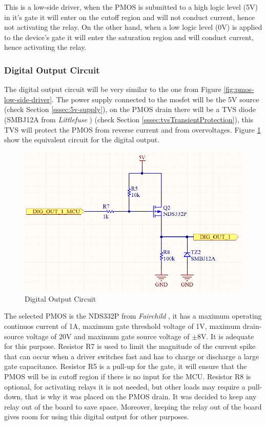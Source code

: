 			This is a low-side driver, when the PMOS is submitted to a high logic level (5V) in it's gate it will enter on the cutoff region and will not conduct current, hence not activating the relay. On the other hand, when a low logic level (0V) is applied to the device's gate it will enter the saturation region and will conduct current, hence activating the relay.

		\subsubsection{Digital Output Circuit}\label{sssec:digital-output-circuit}

			The digital output circuit will be very similar to the one from Figure \ref{fig:pmos-low-side-driver}. The power supply connected to the mosfet will be the 5V source (check Section \ref{sssec:5v-supply}), on the PMOS drain there will be a TVS diode (SMBJ12A from \textit{Littlefuse} \cite{smbj12a-datasheet}) (check Section \ref{sssec:tvsTransientProtection}), this TVS will protect the PMOS from reverse current and from overvoltages. Figure \ref{fig:digital-output-circuit} show the equivalent circuit for the digital output.

			\begin{figure}[htbp]
				\centering
				\includegraphics[scale=1]{figuras/fig-digital-output-circuit.png}
				\caption{Digital Output Circuit \cite{digital-output-circuit}}
				\label{fig:digital-output-circuit}
			\end{figure}

			The selected PMOS is the NDS332P from \textit{Fairchild} \cite{nds332p-datasheet}, it has a maximum operating continuos current of 1A, maximum gate threshold voltage of 1V, maximum drain-source voltage of 20V and maximum gate source voltage of $\pm$8V. It is adequate for this purpose. Resistor R7 is used to limit the magnitude of the current spike that can occur when a driver switches fast and has to charge or discharge a large gate capacitance. Resistor R5 is a pull-up for the gate, it will ensure that the PMOS will be in cutoff region if there is no input for the MCU. Resistor R8 is optional, for activating relays it is not needed, but other loads may require a pull-down, that is why it was placed on the PMOS drain. It was decided to keep any relay out of the board to save space. Moreover, keeping the relay out of the board gives room for using this digital output for other purposes.

